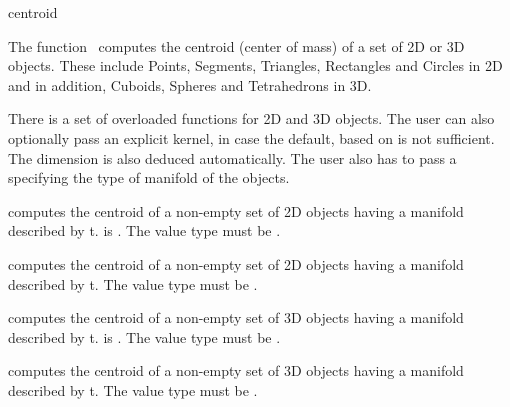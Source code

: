 
\begin{ccRefFunction}{centroid}  

\ccDefinition
  
The function \ccRefName\ computes the centroid (center of mass) of a set
of 2D or 3D objects. These include Points, Segments, Triangles, Rectangles and Circles in 2D and in addition, Cuboids, Spheres and Tetrahedrons in 3D.


There is a set of overloaded  functions for 2D and 3D objects.
The user can also optionally pass an explicit kernel, in case the default,
based on  is not sufficient.
The dimension is also deduced automatically. The user also has to pass a 
specifying the type of manifold of the objects.

{ computes the centroid of a non-empty set of 2D objects having a manifold described by t.
   is .  The value type must be .
 }

{ computes the centroid of a non-empty set of 2D objects having a manifold described by t.
  The value type must be .
 }

{ computes the centroid of a non-empty set of 3D objects having a manifold described by t.
   is .
  The value type must be .
 }

{ computes the centroid of a non-empty set of 3D objects having a manifold described by t.
  The value type must be .
 }


\ccSeeAlso
{}

\end{ccRefFunction}

